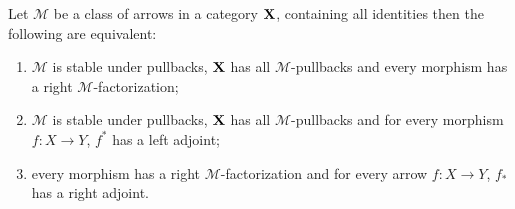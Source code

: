 \documentclass[a4paper,UKenglish,cleveref,pdftex,thm-restate,numberwithinsect]{lipics-v2021}
\def\X{\textbf {\textup{X}}}
\begin{document}
\begin{lemma}\label{lem:rfact}
	Let $\mathcal{M}$ be a class of arrows  in a category $\X$, containing all identities then the following are equivalent:
	\begin{enumerate}
		\item $\mathcal{M}$ is stable under pullbacks, $\X$ has all $\mathcal{M}$-pullbacks and every morphism has a right $\mathcal{M}$-factorization;
		\item $\mathcal{M}$ is stable under pullbacks, $\X$ has all $\mathcal{M}$-pullbacks and for every morphism $f\colon X\to Y$, $f^*$ has a left adjoint;
		\item every morphism has a right $\mathcal{M}$-factorization and for every arrow $f\colon X\to Y$, $f_*$ has a right adjoint.
	\end{enumerate}
\end{lemma}
\end{document}
